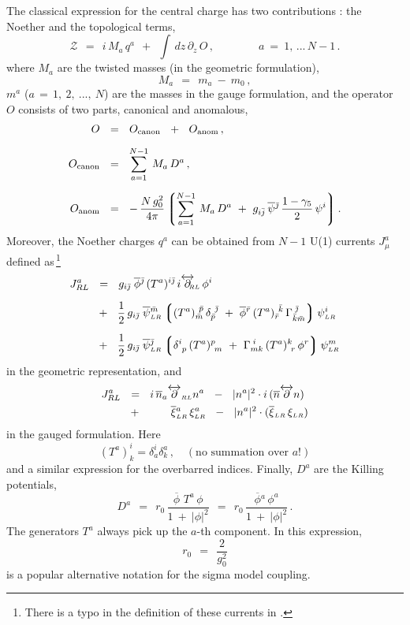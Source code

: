 \documentclass[epsfig,12pt]{article}
\def\beq{\begin{equation}}
\def\eeq{\end{equation}}
\def\beq{\begin{equation}}
\def\eeq{\end{equation}}
\newcommand{\p}{\partial}
\newcommand{\ov}{\overline}
\newcommand{\mc}[1]{\mathcal{#1}}
\newcommand{\lgr}{\left\lgroup}
\newcommand{\rgr}{\right\rgroup}
\newcommand{\bpsi}{\ov{\psi}{}}
\newcommand{\bphi}{\ov{\phi}{}}
\newcommand{\bxi}{\ov{\xi}{}}
\newcommand{\bj}{{\bar \jmath}}
\newcommand{\bmm}{{\bar m}}
\newcommand{\bp}{{\bar p}}
\newcommand{\bkk}{{\bar k}}
\newcommand{\br}{{\bar r}}
\begin{document}
	The classical expression for the central charge has two contributions \cite{SVZw}:
	the Noether and the topological terms,
\beq
        \mc{Z} ~~=~~ i\, M_a\, q^a  ~~+~~ \int\, dz\, \p_z\, O \,, \qquad\qquad
	a ~=~ 1,\,...\, N-1\,.
	\label{21}
\eeq
	where $ M_a $ are the twisted masses (in the geometric formulation),
\beq
	M_a  ~~=~~ m_a ~-~ m_0\,,
\eeq
	$m^a$ ($a \,=\, 1,~2,~ ...,~N $) are the masses in the gauge formulation, 
	and the operator $O$ consists of two parts, canonical and anomalous,
\begin{align}
%
	O & ~~=~~ 
	O_{\rm canon} ~~+~~ O_{\rm anom}\,,
\\[2mm]
%
	O_{\rm canon } 
\label{23}
	& ~~=~~ 
	\sum_{a= 1}^{N-1}\, M_a\, D^a\,,
\\[2mm]
%
	O_{\rm anom} 
\label{24}
	& ~~=~~
	-\, \frac{N\, g_0^2}{4\pi} 
	\lgr
	\sum_{a=1}^{N-1}\, M_a\, D^a ~+~ g_{i\bar{j}} \,\bpsi{}^\bj\, \frac{1-\gamma_5}{2}\,\psi^i
	\rgr.
\end{align}
	Moreover, the Noether charges $ q^a $ can be obtained from $N-1$ U(1) currents $ J_\mu^a $
	defined as\,\footnote{There is a typo in the definition of these currents in \cite{SVZw}.}
\begin{align}
%
	J_{RL}^a  
	& ~~=~~
	 g_{i\bj}\; \bphi^\bj\, (T^a)^{i\bj}\, i\overleftrightarrow{\p}{}_{\scriptscriptstyle \!\!\!\!RL}\, \phi^i   
\nonumber
	\\[2mm]
%
        & 
	~~+~~
        \frac{1}{2}\, g_{i\bj}\; \bpsi{}_{\scriptscriptstyle LR}^\bmm 
        	\lgr  ( T^a )_\bmm^{\ \bp}\, \delta_\bp^{\ \bj} ~+~ 
		\bphi{}^\br\, (T^a)_\br^{\ \bkk}\, \Gamma^{\;\bj}_{\bkk\bmm} \rgr   \psi_{\scriptscriptstyle LR}^i 
\nonumber 
	\\[2mm]
%
        & 
	~~+~~
        \frac{1}{2}\, g_{i\bj}\; \bpsi{}_{\scriptscriptstyle LR}^\bj
               \lgr  \delta^i_{\ p}\, (T^a)^p_{\ m} ~+~ 
	             \Gamma_{mk}^{\;i}\, (T^a)^k_{\ r}\, \phi^r \rgr   \psi_{\scriptscriptstyle LR}^m
\label{u1cur}
\end{align}
	in the geometric representation, and
\begin{align}
%
\notag
       J_{RL}^a  & ~~=~~ i\, \ov{n}{}_a \overleftrightarrow{\p}_{\scriptscriptstyle RL} n^a 
                   ~~-~~ |n^a|^2 \cdot i\, ( \ov{n} \overleftrightarrow{\p} n ) \\
%
                 & ~~+~~ \qquad 
                         \bxi{}_{\scriptscriptstyle LR}^a\, \xi_{\scriptscriptstyle LR}^a  ~~-~~
                         |n^a|^2 \cdot ( \bxi{}_{\scriptscriptstyle LR}\, \xi_{\scriptscriptstyle LR} )
\end{align}
	in the gauged formulation. 
	Here
 \beq
 	\left(T^a\right)^i_k = \delta_a^i\delta^a_k \,,\quad (\mbox{no summation over $a$!})
 \eeq
	and a similar expression for the overbarred indices.
	Finally,
$ D^a $ 
	are the Killing potentials,
\beq
	D^a  ~~=~~ r_0\, \frac{ \bphi\,\, T^a\, \phi } 
	                    {  1  ~+~  |\phi|^2  }
	     ~~=~~ r_0\, \frac{ \bphi^a\, \phi^a   }
	                    {  1  ~+~  |\phi|^2  }\,.
	                    \label{29}
\eeq
	The generators $ T^a $ always pick up the $ a $-th component.
	In this expression, 
\beq
	r _0  ~~=~~ \frac{ 2 }{ g_0^2}
\eeq 
	is a popular alternative notation for the sigma model coupling.
	
\end{document}
